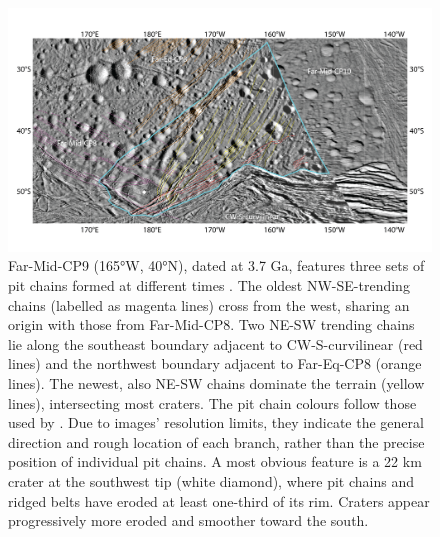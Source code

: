 \documentclass[preprint,11pt,3p,times,authoryear]{elsarticle}
\begin{document}
{\begin{figure}[t]
    \includegraphics[width=1.0\linewidth]{fig/FigS4B_Far-Mid-CP9.png}
    \caption{Far-Mid-CP9 (165°W, 40°N), dated at 3.7 Ga, features three sets of pit chains formed at different times \citep{Martin2014}. The oldest NW-SE-trending chains (labelled as magenta lines) cross from the west, sharing an origin with those from Far-Mid-CP8. Two NE-SW trending chains lie along the southeast boundary adjacent to CW-S-curvilinear (red lines) and the northwest boundary adjacent to Far-Eq-CP8 (orange lines). The newest, also NE-SW chains dominate the terrain (yellow lines), intersecting most craters. The pit chain colours follow those used by \citet{Martin2014}. Due to images’ resolution limits, they indicate the general direction and rough location of each branch, rather than the precise position of individual pit chains. A most obvious feature is a 22 km crater at the southwest tip (white diamond), where pit chains and ridged belts have eroded at least one-third of its rim. Craters appear progressively more eroded and smoother toward the south.}
    \label{fig:app_erosion3}
\end{figure}

}
\end{document}
